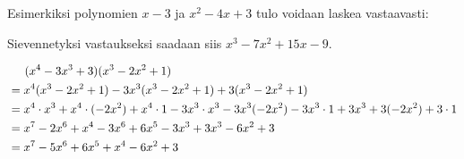 \newcommand{\pbezier}[4]{
	\pgfmathsetmacro{\PBxa}{#1}
	\pgfmathsetmacro{\PBxb}{#2}
	\pgfmathsetmacro{\PBya}{#3}
	\pgfmathsetmacro{\PByb}{#3+#4}
	\pgfmathsetmacro{\PBca}{0.8 * \PBxa + 0.2 * \PBxb}
	\pgfmathsetmacro{\PBcb}{0.2 * \PBxa + 0.8 * \PBxb}
	\draw[color=red] (\PBxa, \PBya) .. controls (\PBca, \PByb) and (\PBcb, \PByb) .. (\PBxb, \PBya);
}


Esimerkiksi polynomien $x-3$ ja $x^2-4x+3$ tulo voidaan laskea vastaavasti:



Sievennetyksi vastaukseksi saadaan siis $x^3-7x^2+15x-9$.

\begin{esimerkki}
\begin{align*}
&\hspace{0.5cm}(x^4-3x^3+3)(x^3-2x^2+1) \\
&= x^4 (x^3-2x^2+1) - 3x^3 (x^3-2x^2+1) + 3 (x^3-2x^2+1) \\
&= x^4\cdot x^3 + x^4\cdot (-2x^2)+x^4\cdot 1-3x^3\cdot x^3-3x^3(-2x^2)-3x^3\cdot1+3x^3+3(-2x^2)+3\cdot 1 \\
&= x^7-2x^6+x^4-3x^6+6x^5-3x^3+3x^3-6x^2+3 \\
&= x^7-5x^6+6x^5+x^4-6x^2+3
\end{align*}
\end{esimerkki}

